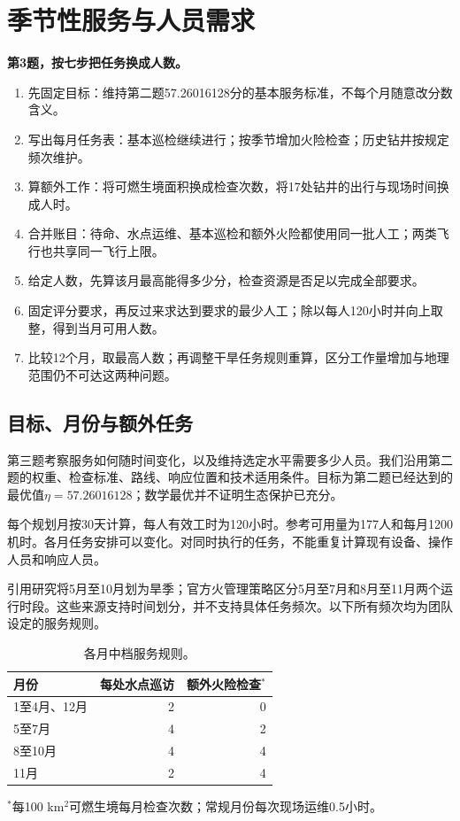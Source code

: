 \documentclass[12pt,a4paper]{article}
\numberwithin{equation}{section}
\begin{document}
\section{季节性服务与人员需求}
\noindent\textbf{第3题，按七步把任务换成人数。}
\begin{enumerate}
\item 先固定目标：维持第二题57.26016128分的基本服务标准，不每个月随意改分数含义。
\item 写出每月任务表：基本巡检继续进行；按季节增加火险检查；历史钻井按规定频次维护。
\item 算额外工作：将可燃生境面积换成检查次数，将17处钻井的出行与现场时间换成人时。
\item 合并账目：待命、水点运维、基本巡检和额外火险都使用同一批人工；两类飞行也共享同一飞行上限。
\item 给定人数，先算该月最高能得多少分，检查资源是否足以完成全部要求。
\item 固定评分要求，再反过来求达到要求的最少人工；除以每人120小时并向上取整，得到当月可用人数。
\item 比较12个月，取最高人数；再调整干旱任务规则重算，区分工作量增加与地理范围仍不可达这两种问题。
\end{enumerate}

\subsection{目标、月份与额外任务}
第三题考察服务如何随时间变化，以及维持选定水平需要多少人员。我们沿用第二题的权重、检查标准、路线、响应位置和技术适用条件。目标为第二题已经达到的最优值$\eta=57.26016128$；数学最优并不证明生态保护已充分。

每个规划月按30天计算，每人有效工时为120小时。参考可用量为177人和每月1200机时。各月任务安排可以变化。对同时执行的任务，不能重复计算现有设备、操作人员和响应人员。

引用研究将5月至10月划为旱季；官方火管理策略区分5月至7月和8月至11月两个运行时段\cite{season,fire}。这些来源支持时间划分，并不支持具体任务频次。以下所有频次均为团队设定的服务规则。

\begin{table}[H]
\centering\normalsize
\caption{各月中档服务规则。}
\label{tab:season}
\begin{tabular}{lrr}
\toprule
月份 & 每处水点巡访 & 额外火险检查$^*$ \\
\midrule
1至4月、12月 & 2 & 0 \\
5至7月 & 4 & 2 \\
8至10月 & 4 & 4 \\
11月 & 2 & 4 \\
\bottomrule
\end{tabular}
\par\smallskip\begin{minipage}{\linewidth}$^*$每100 km$^2$可燃生境每月检查次数；常规月份每次现场运维0.5小时。\end{minipage}
\end{table}
\end{document}
